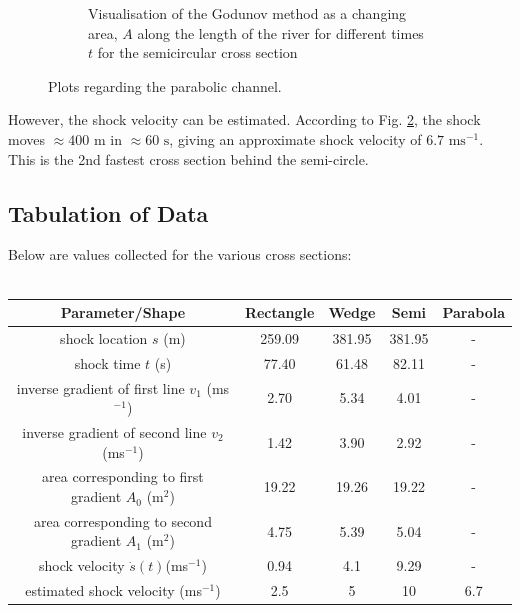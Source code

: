 \documentclass[12pt]{article}
\begin{document}
\begin{figure}[h]
\begin{subfigure}[b]{0.49\textwidth}
        \caption{Visualisation of the Godunov method as a changing area, $A$ along the length of the river for different times $t$ for the semicircular cross section}
        \label{fig:parab_godunov}
    \end{subfigure}
    \caption{Plots regarding the parabolic channel.}
\end{figure}
However, the shock velocity can be estimated. According to Fig. \ref{fig:parab_godunov}, the shock moves $\approx400\text{ m}$ in $\approx 60 \text{ s}$, giving an approximate shock velocity of $ 6.7\text{ ms}^{-1}$. This is the 2nd fastest cross section behind the semi-circle.

\subsection{Tabulation of Data}
Below are values collected for the various cross sections:
\\
\\
\begin{tabular}{|c|c|c|c|c|}
    \hline
    \textbf{Parameter/Shape} & Rectangle & Wedge & Semi & Parabola\\
    \hline
     shock location $s$ (m) & 259.09 & 381.95 & 381.95 & -\\
     \hline
     shock time $t$ (s) & 77.40 & 61.48 & 82.11 & -\\
     \hline
     inverse gradient of first line $v_1$ (ms$^{-1}$) & 2.70 & 5.34 & 4.01 & -\\
     \hline
     inverse gradient of second line $v_2$ (ms$^{-1}$)& 1.42 & 3.90 & 2.92 & -\\
     \hline
     area corresponding to first gradient $A_0$ (m$^{2}$)& 19.22 & 19.26 & 19.22 & -\\
     \hline
     area corresponding to second gradient $A_1$ (m$^{2}$)& 4.75 & 5.39 & 5.04 & -\\
     \hline
     shock velocity $\dot{s}(t)$(ms$^{-1}$) & 0.94 & 4.1 & 9.29 & -\\
     \hline
     estimated shock velocity (ms$^{-1}$)& 2.5 & 5 & 10 & 6.7 \\
     \hline
    
\end{tabular}
\end{document}
